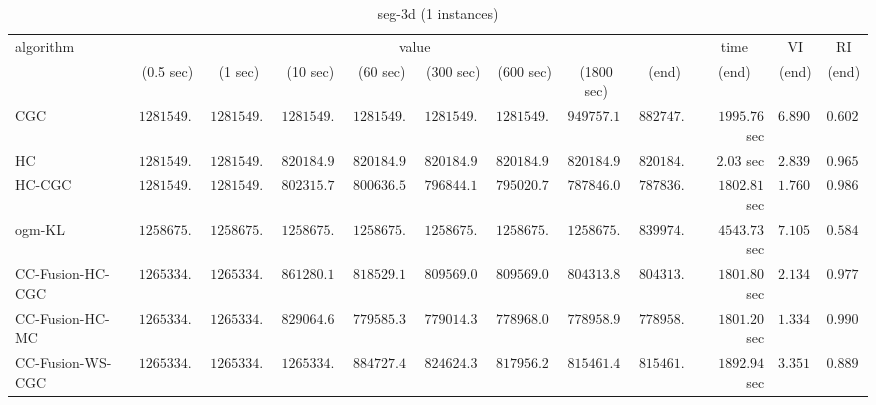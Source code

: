 \begin{table}[H]
\scriptsize
\centering
\caption{seg-3d (1 instances)}
\label{tab:anytimetable-seg-3d}
\begin{tabular}{lrrrrrrrrrrr}
\toprule
           algorithm &                                   \multicolumn{8}{c}{value} & \multicolumn{1}{c}{time}    & \multicolumn{1}{c}{VI}  & \multicolumn{1}{c}{RI} \\  
\cmidrule(lr){2-9}\cmidrule(lr){10-10} \cmidrule(lr){11-11} \cmidrule(lr){12-12}   
                     & \multicolumn{1}{c}{(0.5 sec)} & \multicolumn{1}{c}{(1 sec)} & \multicolumn{1}{c}{(10 sec)} & \multicolumn{1}{c}{(60 sec)} & \multicolumn{1}{c}{(300 sec)} & \multicolumn{1}{c}{(600 sec)} & \multicolumn{1}{c}{(1800 sec)} & \multicolumn{1}{c}{(end)} & \multicolumn{1}{c}{(end)}    & \multicolumn{1}{c}{(end)}   & \multicolumn{1}{c}{(end)}  \\ \midrule 
                 CGC & $   1281549.37$ & $   1281549.37$ & $   1281549.37$ & $   1281549.37$ & $   1281549.37$ & $   1281549.37$ & $    949757.11$ & $    882747.02$ & $      1995.76$ sec    & $       6.8908$  & $       0.6024$ \\ 
                  HC & $   1281549.37$ & $   1281549.37$ & $    820184.98$ & $    820184.98$ & $    820184.98$ & $    820184.98$ & $    820184.98$ & $    820184.98$ & $         2.03$ sec    & $       2.8395$  & $       0.9651$ \\ 
              HC-CGC & $   1281549.37$ & $   1281549.37$ & $    802315.77$ & $    800636.51$ & $    796844.12$ & $    795020.78$ & $    787846.06$ & $    787836.19$ & $      1802.81$ sec    & $       1.7603$  & $       0.9861$ \\ 
              ogm-KL & $   1258675.53$ & $   1258675.53$ & $   1258675.53$ & $   1258675.53$ & $   1258675.53$ & $   1258675.53$ & $   1258675.53$ & $    839974.05$ & $      4543.73$ sec    & $       7.1057$  & $       0.5849$ \\ 
    CC-Fusion-HC-CGC & $   1265334.24$ & $   1265334.24$ & $    861280.16$ & $    818529.13$ & $    809569.07$ & $    809569.07$ & $    804313.81$ & $    804313.81$ & $      1801.80$ sec    & $       2.1347$  & $       0.9775$ \\ 
     CC-Fusion-HC-MC & $   1265334.24$ & $   1265334.24$ & $    829064.68$ & $    779585.33$ & $    779014.36$ & $    778968.07$ & $    778958.97$ & $    778958.97$ & $      1801.20$ sec    & $       1.3347$  & $       0.9906$ \\ 
    CC-Fusion-WS-CGC & $   1265334.24$ & $   1265334.24$ & $   1265334.24$ & $    884727.49$ & $    824624.32$ & $    817956.21$ & $    815461.43$ & $    815461.43$ & $      1892.94$ sec    & $       3.3514$  & $       0.8895$ \\ 

\end{tabular}
\end{table}
